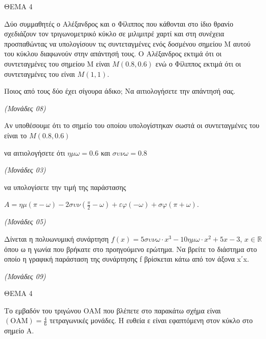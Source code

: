 \documentclass[11pt,a4paper,twoside]{book}
\newcommand{\monades}[1]{\hfill \textit{(Μονάδες #1)}}
\begin{document}
\vspace{4mm}

ΘΕΜΑ 4

Δύο συμμαθητές ο Αλέξανδρος και ο Φίλιππος που κάθονται στο ίδιο θρανίο σχεδιάζουν τον τριγωνομετρικό κύκλο σε μιλιμιτρέ χαρτί και στη συνέχεια προσπαθώντας να υπολογίσουν τις συντεταγμένες ενός δοσμένου σημείου Μ αυτού του κύκλου διαφωνούν στην απάντησή τους. Ο Αλέξανδρος εκτιμά ότι οι συντεταγμένες του σημείου Μ είναι $M(0.8, 0.6)$ ενώ ο Φίλιππος εκτιμά ότι οι συντεταγμένες του είναι $M(1, 1)$.

\begin{alist}
\item Ποιος από τους δύο έχει σίγουρα άδικο; Να αιτιολογήσετε την απάντησή σας.

\monades{08}

\item Αν υποθέσουμε ότι το σημείο του οποίου υπολογίστηκαν σωστά οι συντεταγμένες του είναι το $M(0.8, 0.6)$

\begin{rlist}
\item να αιτιολογήσετε ότι $\eta\mu\omega = 0.6$ και $\sigma\upsilon\nu\omega = 0.8$

\monades{03}

\item να υπολογίσετε την τιμή της παράστασης

$A = \eta\mu(\pi - \omega) - 2\sigma\upsilon\nu\left(\frac{\pi}{2} - \omega\right) + \varepsilon\varphi(-\omega) + \sigma\varphi(\pi + \omega)$.

\monades{05}

\end{rlist}
\item Δίνεται η πολυωνυμική συνάρτηση $f(x) = 5\sigma\upsilon\nu\omega \cdot x^3 - 10\eta\mu\omega \cdot x^2 + 5x - 3$, $x \in \mathbb{R}$ όπου ω η γωνία που βρήκατε στο προηγούμενο ερώτημα. Να βρείτε το διάστημα στο οποίο η γραφική παράσταση της συνάρτησης f βρίσκεται κάτω από τον άξονα x΄x.

\monades{09}
\end{alist}

\vspace{4mm}

ΘΕΜΑ 4

Το εμβαδόν του τριγώνου ΟΑΜ που βλέπετε στο παρακάτω σχήμα είναι $(\text{OAM}) = \frac{4}{6}$ τετραγωνικές μονάδες. Η ευθεία ε είναι εφαπτόμενη στον κύκλο στο σημείο Α.
\end{document}
